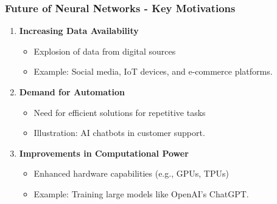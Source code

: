 \documentclass[aspectratio=169]{beamer}
\begin{document}
\begin{frame}[fragile]
    \frametitle{Future of Neural Networks - Key Motivations}
    \begin{enumerate}
        \item \textbf{Increasing Data Availability}
            \begin{itemize}
                \item Explosion of data from digital sources
                \item Example: Social media, IoT devices, and e-commerce platforms.
            \end{itemize}
            
        \item \textbf{Demand for Automation}
            \begin{itemize}
                \item Need for efficient solutions for repetitive tasks
                \item Illustration: AI chatbots in customer support.
            \end{itemize}
            
        \item \textbf{Improvements in Computational Power}
            \begin{itemize}
                \item Enhanced hardware capabilities (e.g., GPUs, TPUs)
                \item Example: Training large models like OpenAI's ChatGPT.
            \end{itemize}
    \end{enumerate}
\end{frame}
\end{document}
